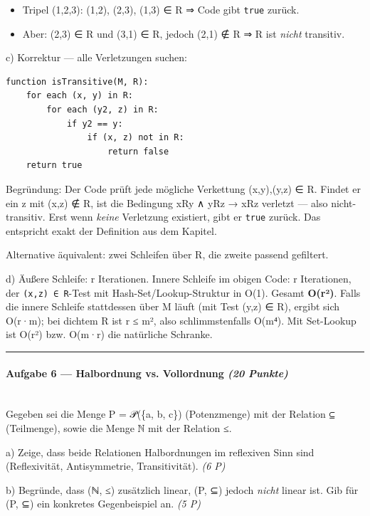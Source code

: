 \documentclass[11pt, a4paper]{article}
\begin{document}
\begin{itemize}
  \item Tripel (1,2,3): (1,2), (2,3), (1,3) ∈ R ⇒ Code gibt \texttt{true} zurück.
  \item Aber: (2,3) ∈ R und (3,1) ∈ R, jedoch (2,1) ∉ R ⇒ R ist \textit{nicht} transitiv.
\end{itemize}

c) Korrektur — alle Verletzungen suchen:


\begin{lstlisting}
function isTransitive(M, R):
    for each (x, y) in R:
        for each (y2, z) in R:
            if y2 == y:
                if (x, z) not in R:
                    return false
    return true
\end{lstlisting}


Begründung: Der Code prüft jede mögliche Verkettung (x,y),(y,z) ∈ R. Findet er ein z mit (x,z) ∉ R, ist die Bedingung xRy ∧ yRz → xRz verletzt — also nicht-transitiv. Erst wenn \textit{keine} Verletzung existiert, gibt er \texttt{true} zurück. Das entspricht exakt der Definition aus dem Kapitel.


Alternative äquivalent: zwei Schleifen über R, die zweite passend gefiltert.


d) Äußere Schleife: r Iterationen. Innere Schleife im obigen Code: r Iterationen, der \texttt{(x,z) ∈ R}-Test mit Hash-Set/Lookup-Struktur in O(1). Gesamt \textbf{O(r²)}. Falls die innere Schleife stattdessen über M läuft (mit Test (y,z) ∈ R), ergibt sich O(r·m); bei dichtem R ist r ≤ m², also schlimmstenfalls O(m⁴). Mit Set-Lookup ist O(r²) bzw. O(m·r) die natürliche Schranke.



\noindent\textcolor{rulegray}{\rule{\linewidth}{0.4pt}}


\paragraph{Aufgabe 6 — Halbordnung vs. Vollordnung \textit{(20 Punkte)}}\mbox{}\\[2pt]

Gegeben sei die Menge P = 𝒫(\{a, b, c\}) (Potenzmenge) mit der Relation ⊆ (Teilmenge), sowie die Menge ℕ mit der Relation ≤.


a) Zeige, dass beide Relationen Halbordnungen im reflexiven Sinn sind (Reflexivität, Antisymmetrie, Transitivität). \textit{(6 P)}

b) Begründe, dass (ℕ, ≤) zusätzlich linear, (P, ⊆) jedoch \textit{nicht} linear ist. Gib für (P, ⊆) ein konkretes Gegenbeispiel an. \textit{(5 P)}
\end{document}
